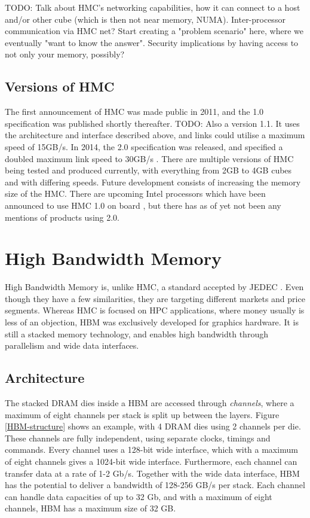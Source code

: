 TODO: Talk about HMC's networking capabilities, how it can connect to a host and/or other cube (which is then not near memory, NUMA). Inter-processor communication via HMC net? Start creating a "problem scenario" here, where we eventually "want to know the answer". Security implications by having access to not only your memory, possibly?

\subsection{Versions of HMC}
The first announcement of HMC was made public in 2011, and the 1.0 specification was published shortly thereafter. TODO: Also a version 1.1. It uses the architecture and interface described above, and links could utilise a maximum speed of 15GB/s. In 2014, the 2.0 specification was released, and specified a doubled maximum link speed to 30GB/s \cite{hybrid2014hybrid}. There are multiple versions of HMC being tested and produced currently, with everything from 2GB to 4GB cubes and with differing speeds. Future development consists of increasing the memory size of the HMC. There are upcoming Intel processors which have been announced to use HMC 1.0 on board \cite{micron2014ikl}, but there has as of yet not been any mentions of products using 2.0. 


\section{High Bandwidth Memory}
High Bandwidth Memory is, unlike HMC, a standard accepted by JEDEC \cite{standard2013high}. Even though they have a few similarities, they are targeting different markets and price segments. Whereas HMC is focused on HPC applications, where money usually is less of an objection, HBM was exclusively developed for graphics hardware. It is still a stacked memory technology, and enables high bandwidth through parallelism and wide data interfaces.

\subsection{Architecture}
The stacked DRAM dies inside a HBM are accessed through \emph{channels}, where a maximum of eight channels per stack is split up between the layers. Figure \ref{HBM-structure} shows an example, with 4 DRAM dies using 2 channels per die. These channels are fully independent, using separate clocks, timings and commands. Every channel uses a 128-bit wide interface, which with a maximum of eight channels gives a 1024-bit wide interface. Furthermore, each channel can transfer data at a rate of 1-2 Gb/s. Together with the wide data interface, HBM has the potential to deliver a bandwidth of 128-256 GB/s per stack. Each channel can handle data capacities of up to 32 Gb, and with a maximum of eight channels, HBM has a maximum size of 32 GB. 
\bigskip

